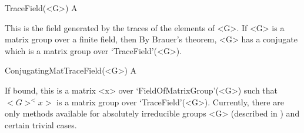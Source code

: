 

\>TraceField(<G>) A

This is the field generated by the traces of the elements of <G>. 
If <G> is a matrix group over a finite field, then By Brauer's
theorem, <G> has a conjugate which is a matrix group over `TraceField'(<G>).

\>ConjugatingMatTraceField(<G>) A

If bound, this is a matrix <x> over `FieldOfMatrixGroup'(<G>) such that
$<G>^<x>$ is a  matrix group over `TraceField'(<G>). Currently, there are
only methods available for absolutely irreducible groups <G> (described in
\cite{GH}) and certain trivial cases. 

